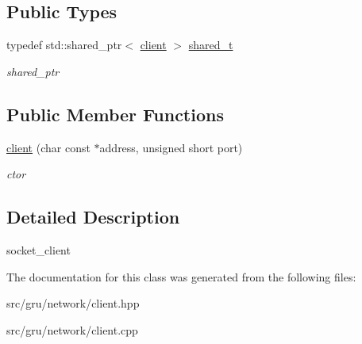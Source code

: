 \subsection*{\-Public \-Types}
\begin{DoxyCompactItemize}
\item 
\hypertarget{classgal_1_1network_1_1client_a87ba8d69e62ce4ee5895913bf597ad6f}{typedef std\-::shared\-\_\-ptr$<$ \hyperlink{classgal_1_1network_1_1client}{client} $>$ \hyperlink{classgal_1_1network_1_1client_a87ba8d69e62ce4ee5895913bf597ad6f}{shared\-\_\-t}}\label{classgal_1_1network_1_1client_a87ba8d69e62ce4ee5895913bf597ad6f}

\begin{DoxyCompactList}\small\item\em shared\-\_\-ptr \end{DoxyCompactList}\end{DoxyCompactItemize}
\subsection*{\-Public \-Member \-Functions}
\begin{DoxyCompactItemize}
\item 
\hypertarget{classgal_1_1network_1_1client_a85a7d1b17d3f72516ad76375c79d7bec}{\hyperlink{classgal_1_1network_1_1client_a85a7d1b17d3f72516ad76375c79d7bec}{client} (char const $\ast$address, unsigned short port)}\label{classgal_1_1network_1_1client_a85a7d1b17d3f72516ad76375c79d7bec}

\begin{DoxyCompactList}\small\item\em ctor \end{DoxyCompactList}\end{DoxyCompactItemize}


\subsection{\-Detailed \-Description}
socket\-\_\-client 

\-The documentation for this class was generated from the following files\-:\begin{DoxyCompactItemize}
\item 
src/gru/network/client.\-hpp\item 
src/gru/network/client.\-cpp\end{DoxyCompactItemize}
